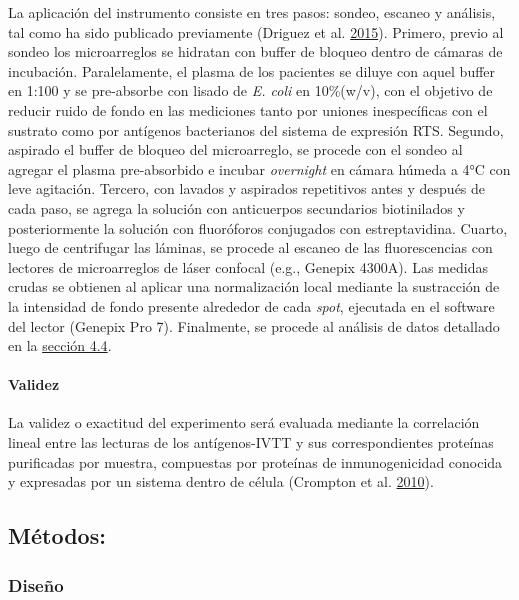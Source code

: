 \documentclass[
  a4paper]{article}
\let\oldparagraph\paragraph
\renewcommand{\paragraph}[1]{\oldparagraph{#1}\mbox{}}
\begin{document}
La aplicación del instrumento consiste en tres pasos: sondeo, escaneo y
análisis, tal como ha sido publicado previamente (Driguez et al.
\protect\hyperlink{ref-Driguez2015}{2015}). Primero, previo al sondeo
los microarreglos se hidratan con buffer de bloqueo dentro de cámaras de
incubación. Paralelamente, el plasma de los pacientes se diluye con
aquel buffer en 1:100 y se pre-absorbe con lisado de \emph{E. coli} en
10\%(w/v), con el objetivo de reducir ruido de fondo en las mediciones
tanto por uniones inespecíficas con el sustrato como por antígenos
bacterianos del sistema de expresión RTS. Segundo, aspirado el buffer de
bloqueo del microarreglo, se procede con el sondeo al agregar el plasma
pre-absorbido e incubar \emph{overnight} en cámara húmeda a 4°C con leve
agitación. Tercero, con lavados y aspirados repetitivos antes y después
de cada paso, se agrega la solución con anticuerpos secundarios
biotinilados y posteriormente la solución con fluoróforos conjugados con
estreptavidina. Cuarto, luego de centrifugar las láminas, se procede al
escaneo de las fluorescencias con lectores de microarreglos de láser
confocal (e.g., Genepix 4300A). Las medidas crudas se obtienen al
aplicar una normalización local mediante la sustracción de la intensidad
de fondo presente alrededor de cada \emph{spot}, ejecutada en el
software del lector (Genepix Pro 7). Finalmente, se procede al análisis
de datos detallado en la \protect\hyperlink{anadata}{sección 4.4}.

\hypertarget{validez}{%
\paragraph{Validez}\label{validez}}

La validez o exactitud del experimento será evaluada mediante la
correlación lineal entre las lecturas de los antígenos-IVTT y sus
correspondientes proteínas purificadas por muestra, compuestas por
proteínas de inmunogenicidad conocida y expresadas por un sistema dentro
de célula (Crompton et al. \protect\hyperlink{ref-crompton2010}{2010}).

\hypertarget{muxe9todos}{%
\subsection{Métodos:}\label{muxe9todos}}

\hypertarget{diseuxf1o}{%
\subsubsection{Diseño}\label{diseuxf1o}}
\end{document}

